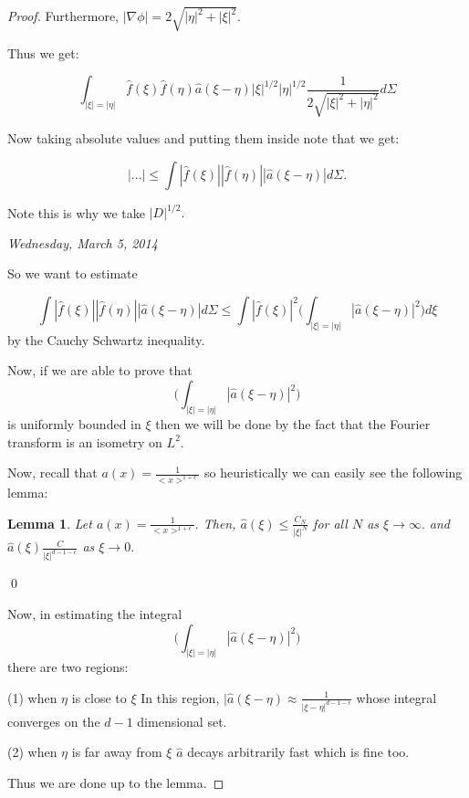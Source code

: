 \documentclass[11pt]{amsart}
\theoremstyle{plain}
\numberwithin{equation}{section}
\newtheorem{lemm}[thm]{Lemma}
\theoremstyle{remark}
\begin{document}
\begin{proof}
Furthermore, $|\nabla \phi|= 2\sqrt{|\eta|^2 + |\xi|^2}.$

Thus we get:

$$\int_{|\xi|=|\eta|} \hat{f}(\xi) \hat{f}(\eta) \hat{a}(\xi-\eta) |\xi|^{1/2} |\eta|^{1/2} \frac{1}{2\sqrt{|\xi|^2+|\eta|^2}}d\Sigma$$

Now taking absolute values and putting them inside note that we get: 


$$|...| \leq \int |\hat{f}(\xi)| |\hat{f}(\eta)| |\hat{a}(\xi-\eta)| d\Sigma.$$

Note this is why we take $|D|^{1/2}.$

\emph{Wednesday, March 5, 2014}

So we want to estimate 

$$ \int |\hat{f}(\xi)| |\hat{f}(\eta)| |\hat{a}(\xi-\eta)| d\Sigma\leq \int |\hat{f}(\xi)|^2 \big ( \int_{|\xi|=|\eta|}|\hat{a}(\xi-\eta)|^2\big )d\xi$$ by the Cauchy Schwartz inequality.

Now, if we are able to prove that $$ \big ( \int_{|\xi|=|\eta|}|\hat{a}(\xi-\eta)|^2\big )$$ is uniformly bounded in $\xi$ then we will be done by the fact that the Fourier transform is an isometry on $L^2.$

Now, recall that  $a(x)=\frac{1}{<x>^{1+\epsilon}}$ so heuristically we can easily see the following lemma:

\begin{lemm}

Let $a(x)=\frac{1}{<x>^{1+\epsilon}}.$
Then, $\hat{a}(\xi) \leq \frac{C_N}{|\xi|^N}$ for all $N$ as $\xi\rightarrow \infty.$
and $\hat{a}(\xi)\frac{C}{|\xi|^{d-1-\epsilon}}$ as $\xi \rightarrow 0.$


\end{lemm}
\qed 


Now, in estimating the integral $$ \big ( \int_{|\xi|=|\eta|}|\hat{a}(\xi-\eta)|^2\big )$$ there are two regions:

(1) when $\eta$ is close to $\xi$ In this region, $|\hat{a}(\xi-\eta) \approx \frac{1}{|\xi-\eta|^{d-1-\epsilon}}$ whose integral converges on the $d-1$ dimensional set. 

(2) when $\eta$ is far away from $\xi$ $\hat{a}$ decays arbitrarily fast which is fine too. 

Thus we are done up to the lemma. 


\end{proof}
\end{document}
